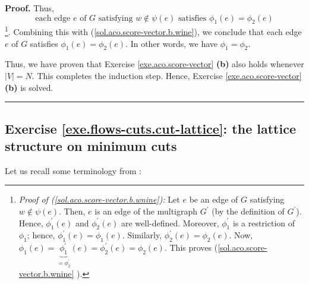 \documentclass[numbers=enddot,12pt,final,onecolumn,notitlepage]{scrartcl}%
\theoremstyle{definition}
\newenvironment{proof}[1][Proof]{\noindent\textbf{#1.} }{\ \rule{0.5em}{0.5em}}
\begin{document}
\begin{proof}
Thus,%
\begin{equation}
\text{each edge }e\text{ of }G\text{ satisfying }w\notin\psi\left(  e\right)
\text{ satisfies }\phi_{1}\left(  e\right)  =\phi_{2}\left(  e\right)
\label{sol.aco.score-vector.b.wnine}%
\end{equation}
\footnote{\textit{Proof of (\ref{sol.aco.score-vector.b.wnine}):} Let $e$ be
an edge of $G$ satisfying $w\notin\psi\left(  e\right)  $. Then, $e$ is an
edge of the multigraph $G^{\prime}$ (by the definition of $G^{\prime}$).
Hence, $\phi_{1}^{\prime}\left(  e\right)  $ and $\phi_{2}^{\prime}\left(
e\right)  $ are well-defined. Moreover, $\phi_{1}^{\prime}$ is a restriction
of $\phi_{1}$; hence, $\phi_{1}^{\prime}\left(  e\right)  =\phi_{1}\left(
e\right)  $. Similarly, $\phi_{2}^{\prime}\left(  e\right)  =\phi_{2}\left(
e\right)  $. Now, $\phi_{1}\left(  e\right)  =\underbrace{\phi_{1}^{\prime}%
}_{=\phi_{2}^{\prime}}\left(  e\right)  =\phi_{2}^{\prime}\left(  e\right)
=\phi_{2}\left(  e\right)  $. This proves (\ref{sol.aco.score-vector.b.wnine}%
).}. Combining this with (\ref{sol.aco.score-vector.b.wine}), we conclude that
each edge $e$ of $G$ satisfies $\phi_{1}\left(  e\right)  =\phi_{2}\left(
e\right)  $. In other words, we have $\phi_{1}=\phi_{2}$.

Thus, we have proven that Exercise \ref{exe.aco.score-vector} \textbf{(b)}
also holds whenever $\left\vert V\right\vert =N$. This completes the induction
step. Hence, Exercise \ref{exe.aco.score-vector} \textbf{(b)} is solved.
\end{proof}

\subsection{Exercise \ref{exe.flows-cuts.cut-lattice}: the
lattice structure on minimum cuts}

Let us recall some terminology from
\cite{lec16}:
\end{document}
